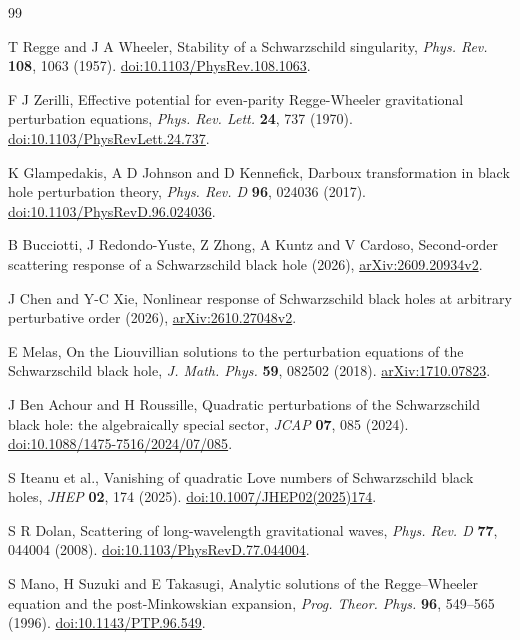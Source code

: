 \documentclass[11pt]{article}
\begin{document}


\begin{thebibliography}{99}

T Regge and J A Wheeler,
Stability of a Schwarzschild singularity,
\emph{Phys. Rev.} \textbf{108}, 1063 (1957).
\href{https://doi.org/10.1103/PhysRev.108.1063}{doi:10.1103/PhysRev.108.1063}.

F J Zerilli,
Effective potential for even-parity Regge-Wheeler gravitational perturbation equations,
\emph{Phys. Rev. Lett.} \textbf{24}, 737 (1970).
\href{https://doi.org/10.1103/PhysRevLett.24.737}{doi:10.1103/PhysRevLett.24.737}.

K Glampedakis, A D Johnson and D Kennefick,
Darboux transformation in black hole perturbation theory,
\emph{Phys. Rev. D} \textbf{96}, 024036 (2017).
\href{https://doi.org/10.1103/PhysRevD.96.024036}{doi:10.1103/PhysRevD.96.024036}.

B Bucciotti, J Redondo-Yuste, Z Zhong, A Kuntz and V Cardoso,
Second-order scattering response of a Schwarzschild black hole (2026),
\href{https://arxiv.org/abs/2609.20934v2}{arXiv:2609.20934v2}.

J Chen and Y-C Xie,
Nonlinear response of Schwarzschild black holes at arbitrary perturbative order (2026),
\href{https://arxiv.org/abs/2610.27048v2}{arXiv:2610.27048v2}.

E Melas,
On the Liouvillian solutions to the perturbation equations of the Schwarzschild black hole,
\emph{J. Math. Phys.} \textbf{59}, 082502 (2018).
\href{https://arxiv.org/abs/1710.07823}{arXiv:1710.07823}.

J Ben Achour and H Roussille,
Quadratic perturbations of the Schwarzschild black hole: the algebraically special sector,
\emph{JCAP} \textbf{07}, 085 (2024).
\href{https://doi.org/10.1088/1475-7516/2024/07/085}{doi:10.1088/1475-7516/2024/07/085}.

S Iteanu et al.,
Vanishing of quadratic Love numbers of Schwarzschild black holes,
\emph{JHEP} \textbf{02}, 174 (2025).
\href{https://doi.org/10.1007/JHEP02(2025)174}{doi:10.1007/JHEP02(2025)174}.

S R Dolan, Scattering of long-wavelength gravitational waves,
\emph{Phys. Rev. D} \textbf{77}, 044004 (2008).
\href{https://doi.org/10.1103/PhysRevD.77.044004}{doi:10.1103/PhysRevD.77.044004}.

S Mano, H Suzuki and E Takasugi,
Analytic solutions of the Regge--Wheeler equation and the post-Minkowskian expansion,
\emph{Prog. Theor. Phys.} \textbf{96}, 549--565 (1996).
\href{https://doi.org/10.1143/PTP.96.549}{doi:10.1143/PTP.96.549}.


\end{thebibliography}
\end{document}
